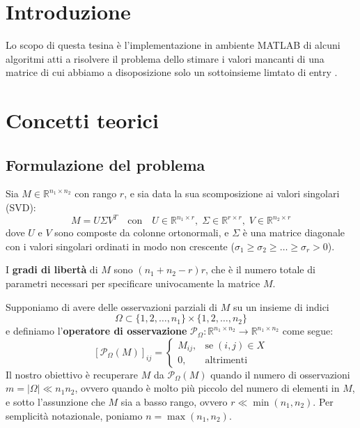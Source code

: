 \documentclass[12pt,a4paper]{report}
\begin{document}


\chapter{Introduzione}

Lo scopo di questa tesina è l'implementazione in ambiente MATLAB di alcuni algoritmi
atti a risolvere il problema dello stimare i valori mancanti di una matrice di cui
abbiamo a disoposizione solo un sottoinsieme limtato di entry \cite{lowrank}.

{\let\clearpage\relax\chapter{Concetti teorici}}

\section{Formulazione del problema}

Sia $M\in\mathbb{R}^{n_1\times n_2}$ con rango $r$, e sia data la sua scomposizione ai valori
singolari (SVD):
$$M=U\Sigma V^T \quad\text{con}\quad U\in\mathbb{R}^{n_1\times r},
\;\Sigma\in\mathbb{R}^{r\times r},\;V\in\mathbb{R}^{n_2\times r}$$
dove $U$ e $V$ sono composte da colonne ortonormali, e $\Sigma$ è una matrice
diagonale con i valori singolari ordinati in modo non crescente
($\sigma_1\geq\sigma_2\geq\ldots\geq\sigma_r>0$).

I \textbf{gradi di libertà} di $M$ sono $(n_1 + n_2 - r)r$, che è il numero totale di parametri
necessari per specificare univocamente la matrice $M$.

\newpage

Supponiamo di avere delle osservazioni parziali di $M$ su un insieme di indici
$$\Omega \subset \{1,2,\ldots,n_1\}\times\{1,2,\ldots,n_2\}$$
e definiamo l'\textbf{operatore di osservazione}
$\mathcal{P}_{\Omega}:\mathbb{R}^{n_1\times n_2}\to\mathbb{R}^{n_1\times n_2}$ come segue:
$$\left[\mathcal{P}_{\Omega}(M)\right] _{ij}=\left\{\begin{matrix}M_{ij}, & \text{se}\; (i,j)\in X \\ 0, & \text{altrimenti}\end{matrix}\right.$$
Il nostro obiettivo è recuperare $M$ da $\mathcal{P}_{\Omega}(M)$
quando il numero di osservazioni\\ $m = |\Omega| \ll n_1 n_2$, ovvero quando
è molto più piccolo del numero di elementi in $M$, e sotto l'assunzione che $M$
sia a basso rango, ovvero $r\ll\min(n_1,n_2)$.
Per semplicità notazionale, poniamo $n=\max(n_1,n_2)$.
\end{document}

